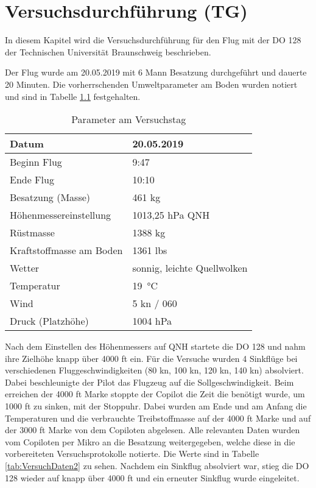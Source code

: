 \chapter{Versuchsdurchführung (TG)}
\label{c:VdurchF}

In diesem Kapitel wird die Versuchsdurchführung für den Flug mit der DO 128 der Technischen Universität Braunschweig beschrieben. 

Der Flug wurde am 20.05.2019 mit 6 Mann Besatzung durchgeführt und dauerte 20 Minuten. Die vorherrschenden Umweltparameter am Boden wurden notiert und sind in Tabelle \ref{tab:VersuchDaten1} festgehalten. 


\begin{table}[h]
	\centering
	\begin{tabular}{| l | l | }
\hline
	Datum  & 20.05.2019 \\ \hline
	Beginn Flug & 9:47 \\ \hline
	Ende Flug & 10:10 \\ \hline
	Besatzung (Masse) & 461 kg \\ \hline
	Höhenmessereinstellung & 1013,25 hPa QNH \\ \hline
	Rüstmasse & 1388 kg \\ \hline
	Kraftstoffmasse am Boden & 1361 lbs \\ \hline
	Wetter & sonnig, leichte Quellwolken \\ \hline
	Temperatur  & \SI{19}{\celsius} \\ \hline
	Wind & 5 kn / 060 \\ \hline
	Druck (Platzhöhe)  & 1004 hPa  \\ \hline
	\end{tabular}
	\caption{Parameter am Versuchstag}
	\label{tab:VersuchDaten1}
\end{table}

Nach dem Einstellen des Höhenmessers auf QNH startete die DO 128 und nahm ihre Zielhöhe knapp über 4000 ft ein. Für die Versuche wurden 4 Sinkflüge bei verschiedenen Fluggeschwindigkeiten (80 kn, 100 kn, 120 kn, 140 kn) absolviert. Dabei beschleunigte der Pilot das Flugzeug auf die Sollgeschwindigkeit. Beim erreichen der 4000 ft Marke stoppte der Copilot die Zeit die benötigt wurde, um 1000 ft zu sinken, mit der Stoppuhr. Dabei wurden am Ende und am Anfang die Temperaturen und die verbrauchte Treibstoffmasse auf der 4000 ft Marke und auf der 3000 ft Marke von dem Copiloten abgelesen. Alle relevanten Daten wurden vom Copiloten per Mikro an die Besatzung weitergegeben, welche diese in die vorbereiteten Versuchsprotokolle notierte. Die Werte sind in Tabelle \ref{tab:VersuchDaten2} zu sehen. Nachdem ein Sinkflug absolviert war, stieg die DO 128 wieder auf knapp über 4000 ft und ein erneuter Sinkflug wurde eingeleitet. 


